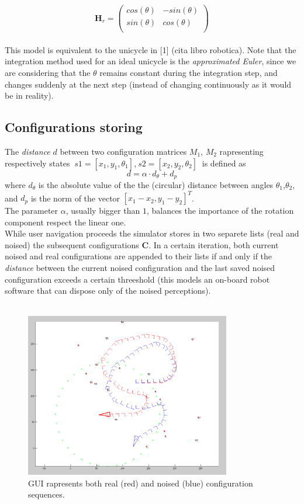 \[ 
\textbf{H}_r =
\left( \begin{array}{cc}
  cos(\theta)  & -sin(\theta)\\ 
  sin(\theta)  & cos(\theta) \\
\end{array} \right)
\]\\
This model is equivalent to the unicycle in [1] (cita libro robotica).
Note that the integration method used for an ideal unicycle is the \textit{approximated Euler}, since we are considering that the $\theta$ remains constant during the integration step,
and changes suddenly at the next step (instead of changing continuously as it would be in reality).\\
\subsection{Configurations storing}
The \textit{distance} $d$ between two configuration matrices $M_1$, $M_2$ rapresenting respectively states $~ s1 = [x_1,y_1,\theta_1]$,$~ s2 = [x_2,y_2,\theta_2]~$
is defined as
\[ 
d = \alpha \cdot d_{\theta} + d_p
\]
where $d_{\theta}$ is the absolute value of the the (circular) distance between angles $\theta_1$,$\theta_2$,
and $d_p$ is the norm of the vector $[x_1 - x_2,y_1 - y_2]^T$.\\
The parameter $\alpha$, usually bigger than $1$, balances the importance of the rotation component respect the linear one.\\
While user navigation proceeds the simulator stores in two separete lists (real and noised) the subsequent configurations $\textbf{C}$.
In a certain iteration, both current noised and real configurations are appended to their lists if and only if the \textit{distance} between the current noised configuration 
and the last saved noised configuration exceeds a certain threeshold (this models an on-board robot software that can dispose only of the noised perceptions).\\
\\
\begin{figure}[htbp]
  \centering
    \includegraphics[width=0.8\textwidth]{images/matlab_simulator.png}
  \caption{GUI rapresents both real (red) and noised (blue) configuration sequences.}
  \label{fig:matlab_simulator}
\end{figure}

